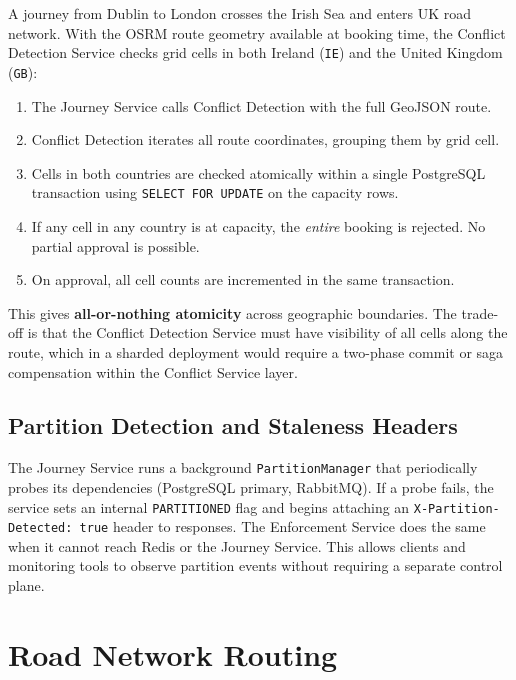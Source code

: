 \documentclass[12pt,a4paper]{article}
\begin{document}
A journey from Dublin to London crosses the Irish Sea and enters UK road network. With the OSRM route geometry available at booking time, the Conflict Detection Service checks grid cells in both Ireland (\texttt{IE}) and the United Kingdom (\texttt{GB}):

\begin{enumerate}[leftmargin=*]
  \item The Journey Service calls Conflict Detection with the full GeoJSON route.
  \item Conflict Detection iterates all route coordinates, grouping them by grid cell.
  \item Cells in both countries are checked atomically within a single PostgreSQL transaction using \texttt{SELECT FOR UPDATE} on the capacity rows.
  \item If any cell in any country is at capacity, the \emph{entire} booking is rejected. No partial approval is possible.
  \item On approval, all cell counts are incremented in the same transaction.
\end{enumerate}

This gives \textbf{all-or-nothing atomicity} across geographic boundaries. The trade-off is that the Conflict Detection Service must have visibility of all cells along the route, which in a sharded deployment would require a two-phase commit or saga compensation within the Conflict Service layer.

\subsection{Partition Detection and Staleness Headers}

The Journey Service runs a background \texttt{PartitionManager} that periodically probes its dependencies (PostgreSQL primary, RabbitMQ). If a probe fails, the service sets an internal \texttt{PARTITIONED} flag and begins attaching an \texttt{X-Partition-Detected: true} header to responses. The Enforcement Service does the same when it cannot reach Redis or the Journey Service. This allows clients and monitoring tools to observe partition events without requiring a separate control plane.

\section{Road Network Routing}
\end{document}
